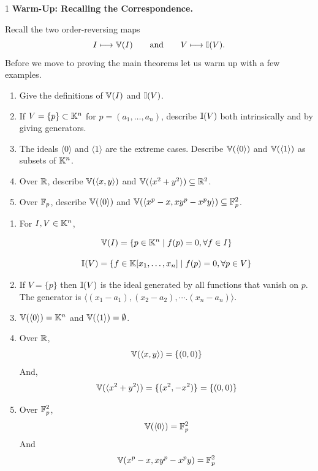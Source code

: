 \documentclass[Notebook.tex]{subfiles}
\begin{document}
\hrulefill

\newpage 

\begin{problem}{1}
    \textbf{Warm-Up: Recalling the Correspondence.} 
    
    Recall the two order-reversing maps
    \[
    I \longmapsto \mathbb V(I)
    \qquad\text{and}\qquad
    V \longmapsto \mathbb I(V).
    \]
    Before we move to proving the main theorems let us warm up with a few examples.
    \begin{enumerate}
    \item Give the definitions of $\mathbb V(I)$ and $\mathbb I(V)$.
    \item  If $V=\{p\} \subset \mathbb K^n$ for $p=(a_1,\ldots,a_n)$, describe $\mathbb I(V)$ both intrinsically and by giving generators.
    \item The ideals $\langle 0\rangle$ and $\langle 1\rangle$ are the extreme cases. Describe $\mathbb V(\langle 0\rangle)$ and $\mathbb V(\langle 1\rangle)$ as subsets of $\mathbb K^n$.
    \item Over $\mathbb R$, describe $\mathbb V(\langle x,y\rangle)$ and $\mathbb V(\langle x^2+y^2\rangle) \subseteq \mathbb R^2$.
    \item Over $\mathbb F_p$, describe $\mathbb V(\langle 0\rangle)$ and $\mathbb V(\langle x^p-x,xy^p-x^py\rangle) \subseteq \mathbb F_p^2$.
    \end{enumerate}
\end{problem}

\begin{solution}
    \bbni
    \begin{enumerate}
        \item For $I, V \in \mathbb K^n$, 
        
        \[\mathbb V(I) = \{p \in \mathbb K^n \mid f(p) = 0, \forall f \in I\}\] 
        
        \[\mathbb I(V) = \{ f \in \mathbb K[x_1, \ldots, x_n] \mid f(p) = 0, \forall p \in V\}\]

        \item If $V = \{p\}$ then $\mathbb I(V)$ is the ideal generated by all functions that vanish on $p$. 
        The generator is $\langle (x_1 - a_1), (x_2 - a_2),  \cdots. (x_n - a_n) \rangle$. 

        \item $\mathbb V(\langle 0 \rangle) = \mathbb K^n$ and $\mathbb V(\langle 1 \rangle) = \emptyset$. 
        
        \item Over $\mathbb R$, 
        \[\mathbb V(\langle x, y \rangle) = \{(0, 0)\}\]
        And,
        \[\mathbb V(\langle x^2 + y^2 \rangle) = \{(x^2, -x^2)\} = \{(0, 0)\}\]

        \item Over $\mathbb F_p^2$, 
        \[\mathbb V(\langle 0 \rangle) = \mathbb F_p^2\]
        And 
        \[\mathbb V(x^p - x, xy^p - x^py) = \mathbb F_p^2\]
    \end{enumerate}
\end{solution}
\end{document}
